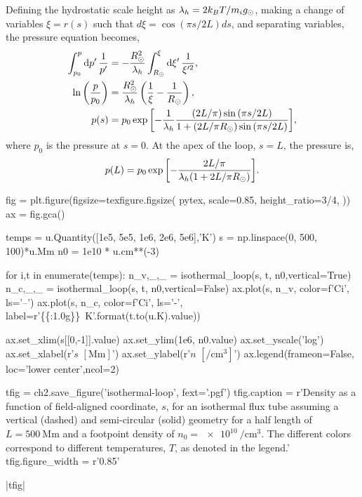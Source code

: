Defining the hydrostatic scale height as $\lambda_h=2k_BT/m_ig_\odot$, making a change of variables $\xi=r(s)$ such that $d\xi=\cos{(\pi s / 2L)}ds$, and separating variables, the pressure equation becomes,
\begin{align}
    \int_{p_0}^p\textup{d}p^\prime\,\frac{1}{p^\prime} &= -\frac{R_\odot^2}{\lambda_h}\int_{R_\odot}^\xi\textup{d}\xi^\prime\,\frac{1}{\xi^{\prime2}},\nonumber \\
    \ln\left(\frac{p}{p_0}\right) &= \frac{R_\odot^2}{\lambda_h}\left(\frac{1}{\xi} - \frac{1}{R_\odot}\right),\nonumber \\
    p(s) &= p_0\exp{\left[-\frac{1}{\lambda_h}\frac{(2L/\pi)\sin{(\pi s/2L)}}{1 + (2L/\pi R_\odot)\sin{(\pi s/2L)}}\right]}, \label{eq:isothermal_pressure}
\end{align}
where $p_0$ is the pressure at $s=0$. At the apex of the loop, $s=L$, the pressure is,
\begin{equation*}
    p(L) = p_0\exp{\left[-\frac{2L/\pi}{\lambda_h(1 + 2L/\pi R_\odot)}\right]}.
\end{equation*}

\begin{pycode}[chapter2]
fig = plt.figure(figsize=texfigure.figsize(
    pytex,
    scale=0.85,
    height_ratio=3/4,
))
ax = fig.gca()

temps = u.Quantity([1e5, 5e5, 1e6, 2e6, 5e6],'K')
s = np.linspace(0, 500, 100)*u.Mm
n0 = 1e10 * u.cm**(-3)

for i,t in enumerate(temps):
    n_v,_,_ = isothermal_loop(s, t, n0,vertical=True)
    n_c,_,_ = isothermal_loop(s, t, n0,vertical=False)
    ax.plot(s, n_v, color=f'C{i}', ls='--')
    ax.plot(s, n_c, color=f'C{i}', ls='-',
            label=r'\SI{{{:1.0g}}}{{\kelvin}}'.format(t.to(u.K).value))

ax.set_xlim(s[[0,-1]].value)
ax.set_ylim(1e6, n0.value)
ax.set_yscale('log')
ax.set_xlabel(r'$s$ $[\si{\mega\m}]$')
ax.set_ylabel(r'$n$ $[\si{\per\cubic\cm}]$')
ax.legend(frameon=False, loc='lower center',ncol=2)

tfig = ch2.save_figure('isothermal-loop', fext='.pgf')
tfig.caption = r'Density as a function of field-aligned coordinate, $s$, for an isothermal flux tube assuming a vertical (dashed) and semi-circular (solid) geometry for a half length of $L=\SI{500}{\mega\m}$ and a footpoint density of $n_0=\SI{e10}{\per\cubic\cm}$. The different colors correspond to different temperatures, $T$, as denoted in the legend.'
tfig.figure_width = r'0.85\textwidth'
\end{pycode}
\py[chapter2]|tfig|


